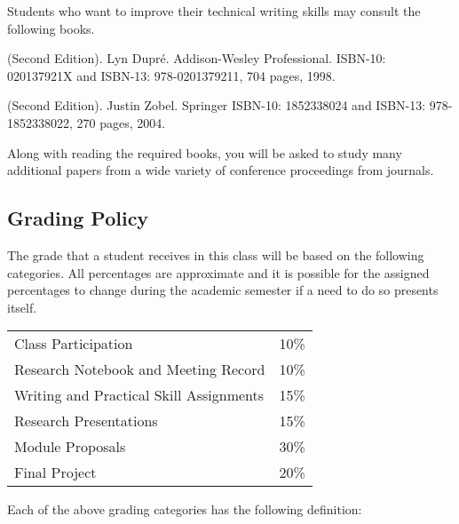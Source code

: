 \noindent
Students who want to improve their technical writing skills may consult the following books.

(Second Edition). Lyn Dupr\'e.  Addison-Wesley Professional.
ISBN-10: 020137921X and ISBN-13: 978-0201379211, 704 pages, 1998.

 (Second Edition).
Justin Zobel.  Springer
ISBN-10: 1852338024 and ISBN-13: 978-1852338022, 270 pages, 2004.

Along with reading the required books, you will be asked to study many
additional papers from a wide variety of conference proceedings from
journals.

\subsection*{Grading Policy}

The grade that a student receives in this class will be based on the
following categories. All percentages are approximate and it is possible
for the assigned percentages to change during the academic semester if a
need to do so presents itself. 

\begin{center}
\begin{tabular}{ll}
Class Participation&10\%\\
Research Notebook and Meeting Record&10\%\\
Writing and Practical Skill Assignments&15\%\\
Research Presentations&15\%\\
Module Proposals&30\%\\
Final Project&20\%
\end{tabular}
\end{center}

Each of the above grading categories has the following definition:

